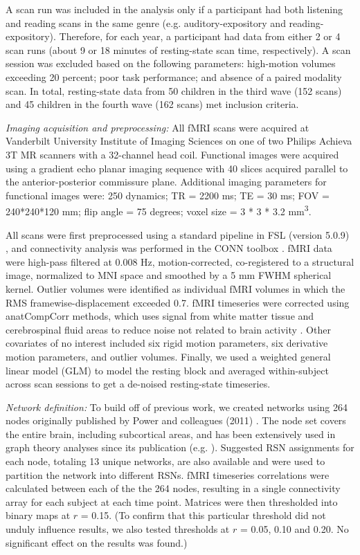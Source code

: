 A scan run was included in the analysis only if a participant had both listening and reading scans in the same genre (e.g. auditory-expository and reading-expository). Therefore, for each year, a participant had data from either 2 or 4 scan runs (about 9 or 18 minutes of resting-state scan time, respectively). A scan session was excluded based on the following parameters: high-motion volumes exceeding 20 percent; poor task performance; and absence of a paired modality scan. In total, resting-state data from 50 children in the third wave (152 scans) and 45 children in the fourth wave (162 scans) met inclusion criteria. 

\emph{Imaging acquisition and preprocessing: } All fMRI scans were acquired at Vanderbilt University Institute of Imaging Sciences on one of two Philips Achieva 3T MR scanners with a 32-channel head coil. Functional images were acquired using a gradient echo planar imaging sequence with 40 slices acquired parallel to the anterior-posterior commissure plane. Additional imaging parameters for functional images were: 250 dynamics; TR = 2200 ms; TE = 30 ms; FOV = 240*240*120 mm; flip angle = 75 degrees; voxel size = 3 * 3 * 3.2 mm\textsuperscript{3}.

All scans were first preprocessed using a standard pipeline in FSL (version 5.0.9) \cite{Jenkinson2012}, and connectivity analysis was performed in the CONN toolbox \cite{WhitfieldGabrieli2012}. fMRI data were high-pass filtered at 0.008 Hz, motion-corrected, co-registered to a structural image, normalized to MNI space and smoothed by a 5 mm FWHM spherical kernel. Outlier volumes were identified as individual fMRI volumes in which the RMS framewise-displacement exceeded 0.7. fMRI timeseries were corrected using anatCompCorr methods, which uses signal from white matter tissue and cerebrospinal fluid areas to reduce noise not related to brain activity \cite{Chai2012}. Other covariates of no interest included six rigid motion parameters, six derivative motion parameters, and outlier volumes. Finally, we used a weighted general linear model (GLM) to model the resting block and averaged within-subject across scan sessions to get a de-noised resting-state timeseries.

\emph{Network definition:} To build off of previous work, we created networks using 264 nodes originally published by Power and colleagues (2011) \cite{Power2011}. The node set covers the entire brain, including subcortical areas, and has been extensively used in graph theory analyses since its publication (e.g. \cite{Cole2014, Godwin2015, Mattar2015}). Suggested RSN assignments for each node, totaling 13 unique networks, are also available and were used to partition the network into different RSNs. fMRI timeseries correlations were calculated between each of the the 264 nodes, resulting in a single connectivity array for each subject at each time point. Matrices were then thresholded into binary maps at $r$ = 0.15. (To confirm that this particular threshold did not unduly influence results, we also tested thresholds at $r$ = 0.05, 0.10 and 0.20. No significant effect on the results was found.)


